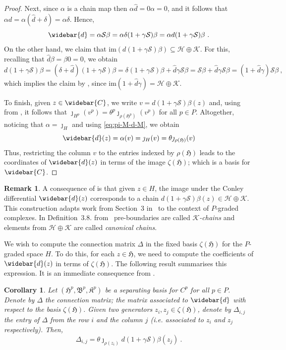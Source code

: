 \documentclass[11pt, table, nothms]{amsart}
\newtheorem{corollary}[theorem]{Corollary}
\theoremstyle{definition}
\newtheorem{remark}[theorem]{Remark}
\newcommand{\cK}{\mathcal{K}}
\newcommand{\cS}{\mathcal{S}}
\newcommand{\cH}{\mathcal{H}}
\newcommand{\fB}{\mathfrak{B}}
\newcommand{\fH}{\mathfrak{H}}
\newcommand{\fK}{\mathfrak{K}}
\newcommand{\oC}{\widebar{C}}
\newcommand{\od}{\widebar{d}}
\newcommand{\ima}{\mathrm{im}}
\begin{document}
{\begin{proof}
    Next, since $\alpha$ is a chain map then $\alpha \widehat{d}=0\alpha = 0$, and it follows that $\alpha d = \alpha (\widehat{d} + \delta) = \alpha \delta$.
    Hence, 
    \begin{equation}\label{eq:pi-M-d-M}
          \od = 
          \alpha\cS\beta=
          \alpha \delta(1 + \gamma\cS) \beta =
          \alpha d(1+\gamma\cS)\beta\ . 
    \end{equation}
    On the other hand, we claim that $\ima(d(1+\gamma\cS)\beta) \subseteq \cH \oplus \cK$. 
    For this, recalling that  $\widehat{d}\beta=\beta0=0$, we obtain
    \[
    d(1+\gamma\cS)\beta=
    (\delta + \widehat{d})(1 + \gamma\cS) \beta = 
    \delta (1+\gamma \cS)\beta + \widehat{d} \gamma \cS \beta = \cS\beta + \widehat{d}\gamma \cS \beta = (1+\widehat{d}\gamma)\cS\beta\ ,
    \]
    which implies the claim by , since $\ima(1+\widehat{d}\gamma)=\cH\oplus \cK$.
    
    To finish, given $z \in \oC$, we write $v = d(1+\gamma\cS)\beta(z)$ and, using  from , it follows that $\jmath_{H^p}(v^p)=\theta^p \jmath_{\rho(\fH^p)}(v^p)$ for all $p \in P$. 
    Altogether, noticing that 
    $\alpha = \jmath_H$ and using \cref{eq:pi-M-d-M}, we obtain
    \[
    \od(z) = \alpha (v) = 
    \jmath_H(v) =
    \theta \jmath_{\rho(\fH)}(v)
    \]
    Thus, restricting the column $v$ to the entries indexed by $\rho(\fH)$ leads to the coordinates of $\od(z)$ in terms of the image $\zeta(\fH)$; which is a basis for $\oC$.
\end{proof}

\begin{remark} 
    A consequence of  is that given $z \in H$, the image under the Conley differential $\od(z)$ corresponds to a chain  $d(1+\gamma\cS)\beta(z) \in \cH\oplus \cK$. 
    This construction adapts work from Section~3 in~\cite{Harker2014DiscreteMaps} to the context of $P$-graded complexes. In Definition~3.8. from~\cite{Harker2014DiscreteMaps} pre-boundaries are called \emph{$\cK$-chains} and elements from $\cH \oplus \cK$ are called \emph{canonical chains}. 
\end{remark}

We wish to compute the connection matrix $\Delta$ in the fixed basis $\zeta(\fH)$ for the $P$-graded space $H$. 
To do this, for each $z \in \fH$, we need to compute the coefficients of $\od(z)$ in terms of $\zeta(\fH)$.
The following result summarises this expression. It is an immediate consequence from .
\begin{corollary}\label{cor:entry-connection}
    Let $(\fH^p, \fB^p, \fK^p)$ be a separating basis for $C^p$ for all $p \in P$.
    Denote by $\Delta$ the connection matrix; the matrix associated to $\od$ with respect to the basis $\zeta(\fH)$.
    Given two generators $z_i, z_j \in \zeta(\fH)$, denote by $\Delta_{i,j}$ the entry of $\Delta$ from the row $i$ and the column $j$ (i.e. associated to $z_i$ and $z_j$ respectively). Then, 
    \[
    \Delta_{i,j} = \theta \jmath_{\rho(z_i)}d(1+\gamma\cS)\beta(z_j)\ .
    \]
\end{corollary}


}
\end{document}
